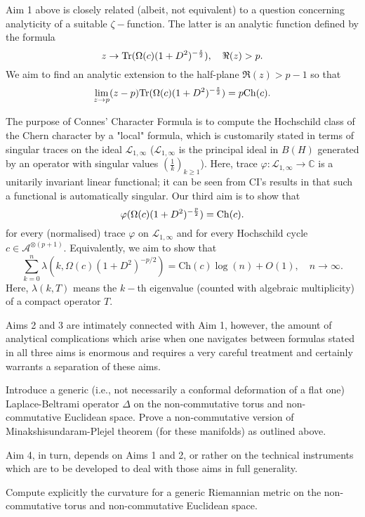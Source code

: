 \documentclass[12pt]{article}
\begin{document}
 Aim 1 above is closely related (albeit, not equivalent) to a question concerning analyticity of a suitable $\zeta-$function. The latter is an analytic function defined by the formula
$$z\to {\rm Tr}(\Omega(c)(1+D^2)^{-\frac{z}{2}}),\quad \Re(z)>p.$$
We aim to find an analytic extension to the half-plane $\Re(z)>p-1$ so that
$$\lim_{z\to p}(z-p){\rm Tr}(\Omega(c)(1+D^2)^{-\frac{z}{2}})=p{\rm Ch}(c).$$

 The purpose of Connes' Character Formula is to compute the Hochschild class of the Chern character by a "local" formula, which is customarily  stated in terms of singular traces on the ideal $\mathcal{L}_{1,\infty}$ ($\mathcal{L}_{1,\infty}$ is the principal ideal in $B(H)$ generated by an operator with singular values $(\frac1k)_{k\geq1}$). Here, trace $\varphi:\mathcal{L}_{1,\infty}\to\mathbb{C}$ is a unitarily invariant linear functional; it can be seen from CI's results in \cite{book} that such a functional is automatically singular. Our third aim is to show that
\begin{equation}\label{super main eq}
\varphi(\Omega(c)(1+D^2)^{-\frac{p}{2}})={\rm Ch}(c).
\end{equation}
for every (normalised) trace $\varphi$ on $\mathcal{L}_{1,\infty}$ and for every Hochschild cycle $c\in\mathcal{A}^{\otimes (p+1)}.$ Equivalently, we aim to show that
$$\sum_{k=0}^n \lambda(k,\Omega(c)(1+D^2)^{-p/2}) = \mathrm{Ch}(c)\log(n)+O(1),\quad n\to\infty.$$
Here, $\lambda(k,T)$ means the $k-$th eigenvalue (counted with algebraic multiplicity) of a compact operator $T.$

Aims 2 and 3 are intimately connected with Aim 1, however, the amount of analytical complications which arise when one navigates between formulas stated in all three aims is enormous and requires a very careful treatment and certainly warrants a separation of these aims.

 Introduce a generic (i.e., not necessarily a conformal deformation of a flat one) Laplace-Beltrami operator $\Delta$ on the non-commutative torus and non-commutative Euclidean space. Prove a non-commutative version of Minakshisundaram-Plejel theorem (for these manifolds) as outlined above.

Aim 4, in turn, depends on Aims 1 and 2, or rather on the technical instruments which are to be developed to deal with those aims in full generality.

 Compute explicitly the curvature for a generic Riemannian metric on the non-commutative torus and non-commutative Euclidean space.
\end{document}

